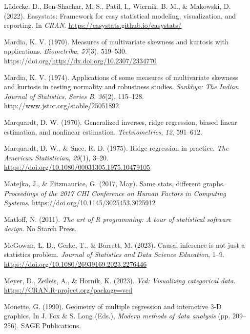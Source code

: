 \documentclass[
  letterpaper,
  10pt,
  krantz2]{krantz}
\newlength{\cslhangindent}
\newlength{\cslentryspacingunit} %
\newenvironment{CSLReferences}[2] %
 {%
  \setlength{\parindent}{0pt}
  \ifodd #1
  \let\oldpar\par
  \def\par{\hangindent=\cslhangindent\oldpar}
  \fi
  \setlength{\parskip}{#2\cslentryspacingunit}
 }%
 {}
\begin{document}
\begin{CSLReferences}{1}{0}
\leavevmode{}%
Lüdecke, D., Ben-Shachar, M. S., Patil, I., Wiernik, B. M., \& Makowski,
D. (2022). Easystats: Framework for easy statistical modeling,
visualization, and reporting. In \emph{CRAN}.
\url{https://easystats.github.io/easystats/}

\leavevmode{}%
Mardia, K. V. (1970). Measures of multivariate skewness and kurtosis
with applications. \emph{Biometrika}, \emph{57}(3), 519--530.
https://doi.org/\url{http://dx.doi.org/10.2307/2334770}

\leavevmode{}%
Mardia, K. V. (1974). Applications of some measures of multivariate
skewness and kurtosis in testing normality and robustness studies.
\emph{Sankhya: The Indian Journal of Statistics, Series B},
\emph{36}(2), 115--128. \url{http://www.jstor.org/stable/25051892}

\leavevmode{}%
Marquardt, D. W. (1970). Generalized inverses, ridge regression, biased
linear estimation, and nonlinear estimation. \emph{Technometrics},
\emph{12}, 591--612.

\leavevmode{}%
Marquardt, D. W., \& Snee, R. D. (1975). Ridge regression in practice.
\emph{The American Statistician}, \emph{29}(1), 3--20.
\url{https://doi.org/10.1080/00031305.1975.10479105}

\leavevmode{}%
Matejka, J., \& Fitzmaurice, G. (2017, May). Same stats, different
graphs. \emph{Proceedings of the 2017 {CHI} Conference on Human Factors
in Computing Systems}. \url{https://doi.org/10.1145/3025453.3025912}

\leavevmode{}%
Matloff, N. (2011). \emph{The art of {R} programming: {A} tour of
statistical software design}. No Starch Press.

\leavevmode{}%
McGowan, L. D., Gerke, T., \& Barrett, M. (2023). Causal inference is
not just a statistics problem. \emph{Journal of Statistics and Data
Science Education}, 1--9.
\url{https://doi.org/10.1080/26939169.2023.2276446}

\leavevmode{}%
Meyer, D., Zeileis, A., \& Hornik, K. (2023). \emph{Vcd: Visualizing
categorical data}. \url{https://CRAN.R-project.org/package=vcd}

\leavevmode{}%
Monette, G. (1990). Geometry of multiple regression and interactive
3-{D} graphics. In J. Fox \& S. Long (Eds.), \emph{Modern methods of
data analysis} (pp. 209--256). SAGE Publications.


\end{CSLReferences}
\end{document}

